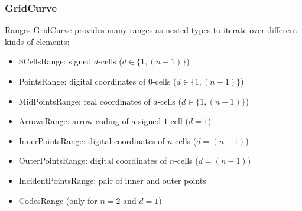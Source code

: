 \begin{frame}
  \frametitle{GridCurve}

  \begin{block}{Ranges}
GridCurve provides many ranges as nested types to iterate over different kinds of elements:
\begin{itemize}
   \item<1> SCellsRange: signed $d$-cells ($d \in \{1,(n-1)\}$)
   \item<2> PointsRange: digital coordinates of $0$-cells ($d \in \{1,(n-1)\}$)
   \item<3> MidPointsRange: real coordinates of $d$-cells ($d \in \{1,(n-1)\}$)
   \item<4> ArrowsRange: arrow coding of a signed $1$-cell ($d = 1$)
   \item<5> InnerPointsRange: digital coordinates of $n$-cells ($d = (n-1)$)
   \item<6> OuterPointsRange: digital coordinates of $n$-cells ($d = (n-1)$)
   \item<7> IncidentPointsRange: pair of inner and outer points
   \item<8> CodesRange (only for $n = 2$ and $d = 1$)
\end{itemize}
  \end{block}

\end{frame}

